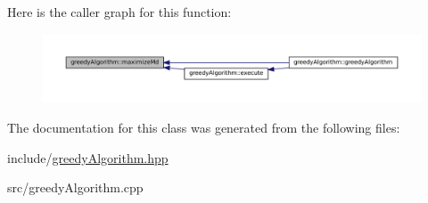 Here is the caller graph for this function\+:\nopagebreak
\begin{figure}[H]
\begin{center}
\leavevmode
\includegraphics[width=350pt]{classgreedyAlgorithm_a4968e1371d2fdfb1b1b6f24b57dd1f07_icgraph}
\end{center}
\end{figure}


The documentation for this class was generated from the following files\+:\begin{DoxyCompactItemize}
\item 
include/\hyperlink{greedyAlgorithm_8hpp}{greedy\+Algorithm.\+hpp}\item 
src/greedy\+Algorithm.\+cpp\end{DoxyCompactItemize}
